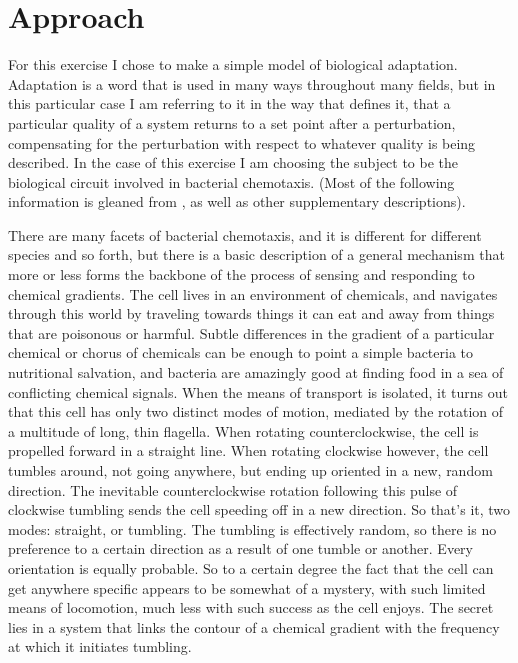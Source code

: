 \documentclass[12pt]{article}
\begin{document}
\maketitle

\section{Approach}

For this exercise I chose to make a simple model of biological adaptation.  Adaptation is a word that is used in many ways throughout many fields, but in this particular case I am referring to it in the way that \cite{Alon} defines it, that a particular quality of a system returns to a set point after a perturbation, compensating for the perturbation with respect to whatever quality is being described.  In the case of this exercise I am choosing the subject to be the biological circuit involved in bacterial chemotaxis.   (Most of the following information is gleaned from \cite{Alon}, as well as other supplementary descriptions).  

There are many facets of bacterial chemotaxis, and it is different for different species and so forth, but there is a basic description of a general mechanism that more or less forms the backbone of the process of sensing and responding to chemical gradients.  The cell lives in an environment of chemicals, and navigates through this world by traveling towards things it can eat and away from things that are poisonous or harmful.  Subtle differences in the gradient of a particular chemical or chorus of chemicals can be enough to point a simple bacteria to nutritional salvation, and bacteria are amazingly good at finding food in a sea of conflicting chemical signals.  When the means of transport is isolated, it turns out that this cell has only two distinct modes of motion, mediated by the rotation of a multitude of long, thin flagella.  When rotating counterclockwise, the cell is propelled forward in a straight line.  When rotating clockwise however, the cell tumbles around, not going anywhere, but ending up oriented in a new, random direction.  The inevitable counterclockwise rotation following this pulse of clockwise tumbling sends the cell speeding off in a new direction.  So that's it, two modes: straight, or tumbling.  The tumbling is effectively random, so there is no preference to a certain direction as a result of one tumble or another.  Every orientation is equally probable.  So to a certain degree the fact that the cell can get anywhere specific appears to be somewhat of a mystery, with such limited means of locomotion, much less with such success as the cell enjoys.  The secret lies in a system that links the contour of a chemical gradient with the frequency at which it initiates tumbling.  
\end{document}
